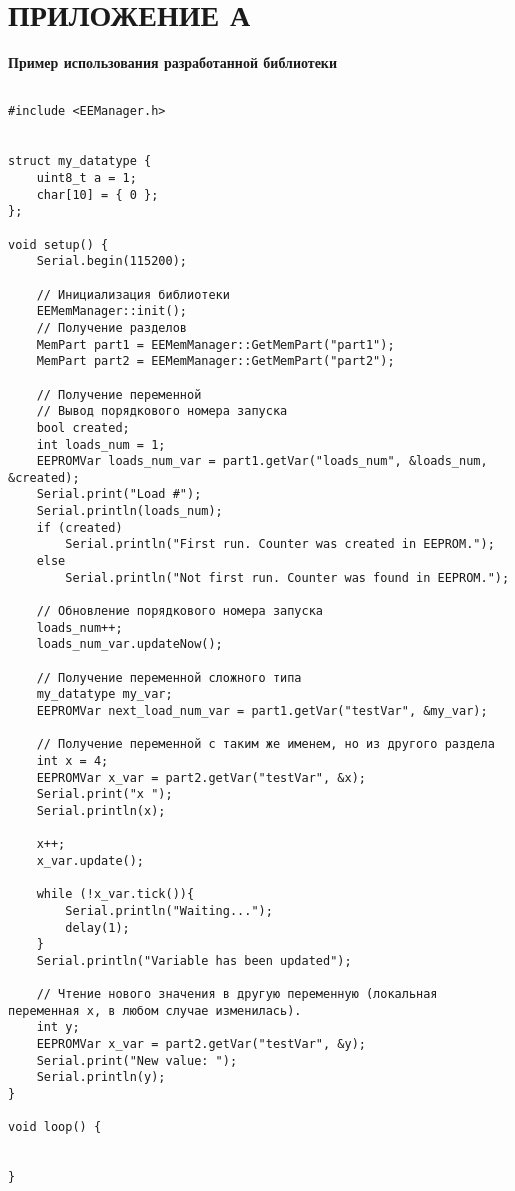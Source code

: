 \chapter*{ПРИЛОЖЕНИЕ А} \label{app:appendix-usage-example}

\begin{center}
    \bfseries Пример использования разработанной библиотеки
\end{center}

\begin{verbatim}
    
#include <EEManager.h>


struct my_datatype {
    uint8_t a = 1;
    char[10] = { 0 };
};

void setup() {
    Serial.begin(115200);

    // Инициализация библиотеки
    EEMemManager::init();
    // Получение разделов
    MemPart part1 = EEMemManager::GetMemPart("part1");
    MemPart part2 = EEMemManager::GetMemPart("part2");

    // Получение переменной
    // Вывод порядкового номера запуска
    bool created;
    int loads_num = 1;
    EEPROMVar loads_num_var = part1.getVar("loads_num", &loads_num, &created);
    Serial.print("Load #");
    Serial.println(loads_num);
    if (created)
        Serial.println("First run. Counter was created in EEPROM.");
    else
        Serial.println("Not first run. Counter was found in EEPROM.");

    // Обновление порядкового номера запуска
    loads_num++;
    loads_num_var.updateNow();

    // Получение переменной сложного типа
    my_datatype my_var;
    EEPROMVar next_load_num_var = part1.getVar("testVar", &my_var);

    // Получение переменной с таким же именем, но из другого раздела
    int x = 4;
    EEPROMVar x_var = part2.getVar("testVar", &x);
    Serial.print("x ");
    Serial.println(x);

    x++;
    x_var.update();

    while (!x_var.tick()){
        Serial.println("Waiting...");
        delay(1);
    }
    Serial.println("Variable has been updated");

    // Чтение нового значения в другую переменную (локальная переменная x, в любом случае изменилась).
    int y;
    EEPROMVar x_var = part2.getVar("testVar", &y);
    Serial.print("New value: ");
    Serial.println(y);
}

void loop() {
    

}
    
\end{verbatim}

